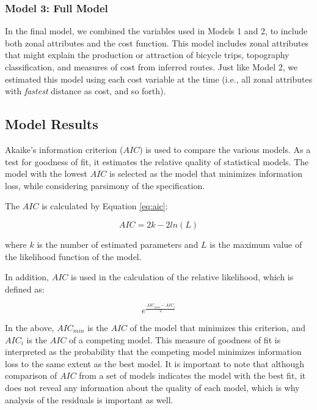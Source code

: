 \documentclass[smallextended]{svjour3}       %
\begin{document}
\hypertarget{model-3-full-model}{%
\subsubsection{Model 3: Full Model}\label{model-3-full-model}}

In the final model, we combined the variables used in Models 1 and 2, to
include both zonal attributes and the cost function. This model includes
zonal attributes that might explain the production or attraction of
bicycle trips, topography classification, and measures of cost from
inferred routes. Just like Model 2, we estimated this model using each
cost variable at the time (i.e., all zonal attributes with
\emph{fastest} distance as cost, and so forth).

\hypertarget{model-results}{%
\subsection{Model Results}\label{model-results}}

Akaike's information criterion (\(AIC\)) is used to compare the various
models. As a test for goodness of fit, it estimates the relative quality
of statistical models. The model with the lowest \(AIC\) is selected as
the model that minimizes information loss, while considering parsimony
of the specification.

The \(AIC\) is calculated by Equation \ref{eq:aic}:

\begin{equation}
\label{eq:aic}
AIC = 2k - 2ln(L) 
\end{equation}

\noindent where \(k\) is the number of estimated parameters and \(L\) is
the maximum value of the likelihood function of the model.

In addition, \(AIC\) is used in the calculation of the relative
likelihood, which is defined as:

\begin{equation}
\label{eq:relative-likelihood}
e^{\frac{AIC_{min} - AIC_i}{2}}
\end{equation}

In the above, \(AIC_{min}\) is the \(AIC\) of the model that minimizes
this criterion, and \(AIC_i\) is the \(AIC\) of a competing model. This
measure of goodness of fit is interpreted as the probability that the
competing model minimizes information loss to the same extent as the
best model. It is important to note that although comparison of \(AIC\)
from a set of models indicates the model with the best fit, it does not
reveal any information about the quality of each model, which is why
analysis of the residuals is important as well.
\end{document}
